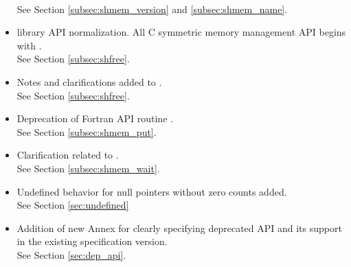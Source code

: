 \begin{itemize}
\\See Section \ref{subsec:shmem_version} and \ref{subsec:shmem_name}.
\item \openshmem library API normalization. All C symmetric memory management API begins with  .
\\See Section \ref{subsec:shfree}.
\item Notes and clarifications added to .
\\See Section \ref{subsec:shfree}.
\item Deprecation of Fortran API routine .
\\See Section \ref{subsec:shmem_put}. 
\item Clarification related to .
\\See Section \ref{subsec:shmem_wait}.
\item Undefined behavior for null pointers without zero counts added.
\\See Section \ref{sec:undefined}
\item Addition of new Annex for clearly specifying deprecated API and its support in the existing specification version.
\\See Section \ref{sec:dep_api}.

\end{itemize}
